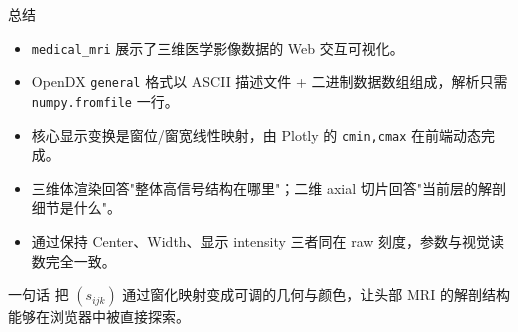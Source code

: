 \documentclass[aspectratio=169,11pt]{ctexbeamer}
\begin{document}
\begin{frame}{总结}
  \begin{itemize}
    \item \texttt{medical\_mri} 展示了三维医学影像数据的 Web 交互可视化。
    \item OpenDX \texttt{general} 格式以 ASCII 描述文件 + 二进制数据数组组成，解析只需 \texttt{numpy.fromfile} 一行。
    \item 核心显示变换是窗位/窗宽线性映射，由 Plotly 的 \texttt{cmin,cmax} 在前端动态完成。
    \item 三维体渲染回答"整体高信号结构在哪里"；二维 axial 切片回答"当前层的解剖细节是什么"。
    \item 通过保持 Center、Width、显示 intensity 三者同在 raw 刻度，参数与视觉读数完全一致。
  \end{itemize}

  \begin{block}{一句话}
    把 $(s_{ijk})$ 通过窗化映射变成可调的几何与颜色，让头部 MRI 的解剖结构能够在浏览器中被直接探索。
  \end{block}
\end{frame}
\end{document}
